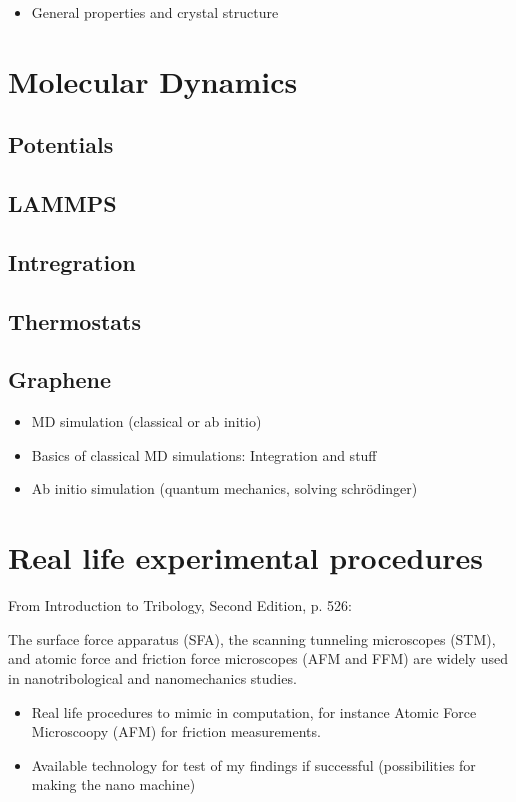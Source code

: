 \begin{itemize}
  \item General properties and crystal structure
\end{itemize}
\section{Molecular Dynamics}
\subsection{Potentials}
\subsection{LAMMPS}
\subsection{Intregration}
\subsection{Thermostats}
\subsection{Graphene}



\begin{itemize}
  \item MD simulation (classical or ab initio)
  \item Basics of classical MD simulations: Integration and stuff
  \item Ab initio simulation (quantum mechanics, solving schrödinger)
\end{itemize}
\section{Real life experimental procedures}
From Introduction to Tribology, Second Edition, p. 526: \par
The surface force apparatus (SFA), the scanning tunneling microscopes (STM), and atomic force and friction force microscopes (AFM and FFM) are widely used in nanotribological and nanomechanics studies.



\begin{itemize}
  \item Real life procedures to mimic in computation, for instance Atomic Force Microscoopy (AFM) for friction measurements.
  \item Available technology for test of my findings if successful (possibilities for making the nano machine) 
\end{itemize}
